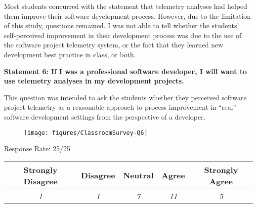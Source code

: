 Most students concurred with the statement that telemetry analyses had helped them improve their software development process. However, due to the limitation of this study, questions remained. I was not able to tell whether the students' self-perceived improvement in their development process was due to the use of the software project telemetry system, or the fact that they learned new development best practice in class, or both.



\newpage
\textbf{Statement 6: If I was a professional software developer, I will want to use telemetry analyses in my development projects.}

This question was intended to ask the students whether they perceived software project telemetry as a reasonable approach to process improvement in ``real'' software development settings from the perspective of a developer. 

\begin{quote}\end{quote} %

\begin{figure}[h]
  \center
  \texttt{[image: figures/ClassroomSurvey-Q6]}
  \label{fig:InClassSurvey-Q6}
\end{figure}

\begin{center}Response Rate: 25/25\end{center}
\begin{table}[h]
	\centering
		\begin{tabular}{|c|c|c|c|c|} 
			\hline
			\textbf{Strongly Disagree} & \textbf{Disagree} & \textbf{Neutral} & \textbf{Agree} & \textbf{Strongly Agree} \\
			\hline
			\textit{1} & \textit{1} & \textit{7} & \textit{11} &\textit{5} \\
			\hline
		\end{tabular}
	\label{table:InClassSurvey-Q6}
\end{table}

